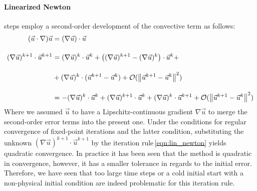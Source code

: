 \paragraph{Linearized Newton} steps employ a second-order development of the convective term as follows:
\begin{equation}
	\begin{split}
		(\vec{u}\cdot\nabla)\vec{u} &= (\nabla\vec{u})\cdot\vec{u}\\[1em]
		(\nabla\vec{u})^{k+1}\cdot\vec{u}^{k+1} &= (\nabla\vec{u})^{k}\cdot\vec{u}^{k} + \left((\nabla\vec{u})^{k+1} - (\nabla\vec{u})^{k}\right)\cdot\vec{u}^{k} +\\[1em]
		&+ (\nabla\vec{u})^{k}\cdot(\vec{u}^{k+1} - \vec{u}^{k}) + \mathcal{O}(\left\lVert\vec{u}^{k+1} - \vec{u}^{k}\right\rVert^2)\\[1em]
		&= -(\nabla\vec{u})^{k}\cdot\vec{u}^{k} + (\nabla\vec{u})^{k+1}\cdot\vec{u}^{k} + (\nabla\vec{u})^{k}\cdot\vec{u}^{k+1} + \mathcal{O}(\left\lVert\vec{u}^{k+1} - \vec{u}^{k}\right\rVert^2)
	\end{split}
	\label{eqn:lin_newton}
\end{equation}
Where we assumed $\vec{u}$ to have a Lipschitz-continuous gradient $\nabla \vec{u}$ to merge the second-order error terms into the present one. Under the conditions for regular convergence of fixed-point iterations and the latter condition, substituting the unknown $(\nabla\vec{u})^{k+1}\cdot\vec{u}^{k+1}$ by the iteration rule\,\eqref{eqn:lin_newton} yields quadratic convergence. In practice it has been seen that the method is quadratic in convergence, however, it has a smaller tolerance in regards to the initial error. Therefore, we have seen that too large time steps or a cold initial start with a non-physical initial condition are indeed problematic for this iteration rule.

